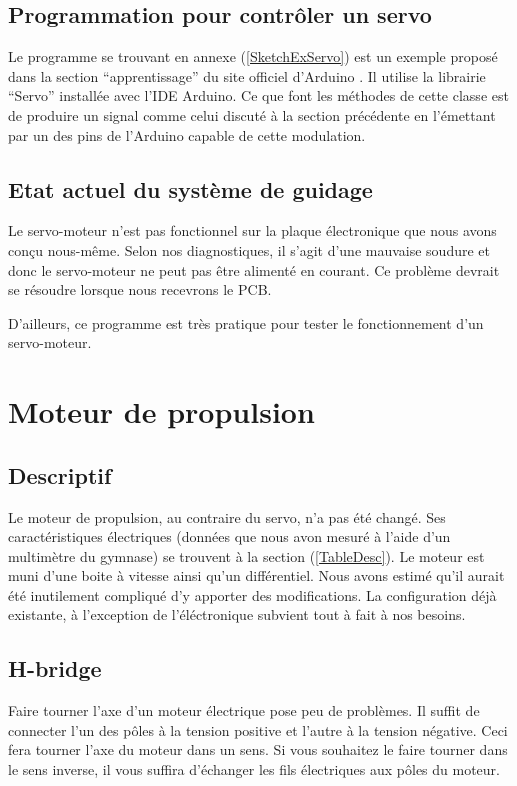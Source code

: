\documentclass[a4paper,11pt]{report}
\begin{document}
{\subsection{Programmation pour contr\^oler un servo}
Le programme se trouvant en annexe (\ref{SketchExServo}) est un exemple propos\'e dans la section
``apprentissage'' du site officiel d'Arduino \cite{ServoSweep}. Il utilise la librairie
``Servo'' installée avec l'IDE Arduino. Ce que font les méthodes de cette
classe est de produire un signal comme celui discuté à la section
précédente en l'émettant par un des pins de l'Arduino capable de cette
modulation. 

\subsection{Etat actuel du système de guidage}
Le servo-moteur n'est pas fonctionnel sur la plaque électronique que nous avons conçu
nous-même. Selon nos diagnostiques, il s'agit d'une mauvaise soudure et donc
le servo-moteur ne peut pas être alimenté en courant. Ce problème devrait se
résoudre lorsque nous recevrons le PCB.


D'ailleurs, ce programme est tr\`es pratique pour tester le fonctionnement d'un servo-moteur. 

\section{Moteur de propulsion}

\subsection{Descriptif}

Le moteur de propulsion, au contraire du servo, n'a pas été changé.
 Ses caractéristiques électriques (données que nous avon mesuré à l'aide
d'un multimètre du gymnase) se trouvent \`a la section
(\ref{TableDesc}). Le moteur est muni d'une boite \`a vitesse ainsi qu'un
différentiel. Nous avons estimé qu'il aurait été
inutilement compliqué d'y apporter des modifications. La
configuration déjà existante, à l'exception de l'éléctronique
subvient tout à fait à nos besoins.  

\subsection{H-bridge}\label{h-bridge}
Faire tourner l'axe d'un moteur \'electrique pose peu de probl\`emes. Il
suffit de connecter l'un des p\^oles \`a la tension positive et l'autre \`a la tension
n\'egative. Ceci fera tourner l'axe du moteur dans un sens. Si vous souhaitez le
faire tourner dans le sens inverse, il vous suffira d'\'echanger les fils
\'electriques aux p\^oles du moteur.

}
\end{document}
